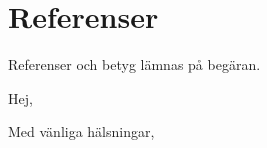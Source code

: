\documentclass[11pt,a4paper,sans]{moderncv}        %
\begin{document}
\section{Referenser}
Referenser och betyg lämnas på begäran.


\nocite{*}



\clearpage
\date{\today}
\opening{Hej,}
\closing{Med vänliga hälsningar,}
\makelettertitle
\end{document}
